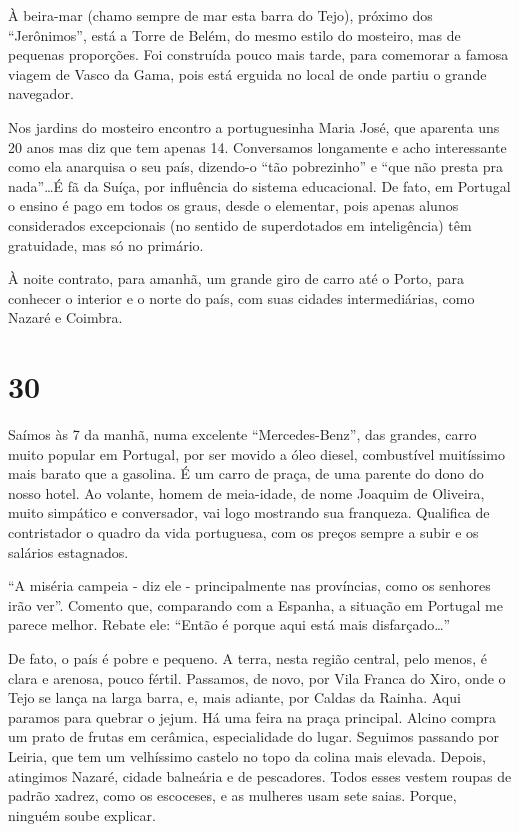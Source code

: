 À beira-mar (chamo sempre de mar esta barra do Tejo), próximo dos ``Jerônimos'', está a Torre de Belém, do mesmo estilo do mosteiro, mas de pequenas proporções. Foi construída pouco mais tarde, para comemorar a famosa viagem de Vasco da Gama, pois está erguida no local de onde partiu o grande navegador.

Nos jardins do mosteiro encontro a portuguesinha Maria José, que aparenta uns 20 anos mas diz que tem apenas 14. Conversamos longamente e acho interessante como ela anarquisa o seu país, dizendo-o ``tão pobrezinho'' e ``que não presta pra nada''\ldots É fã da Suíça, por influência do sistema educacional. De fato, em Portugal o ensino é pago em todos os graus, desde o elementar, pois apenas alunos considerados excepcionais (no sentido de superdotados em inteligência) têm gratuidade, mas só no primário.

À noite contrato, para amanhã, um grande giro de carro até o Porto, para conhecer o interior e o norte do país, com suas cidades intermediárias, como Nazaré e Coimbra.

\section*{30 \adfflatleafright {}}
Saímos às 7 da manhã, numa excelente ``Mercedes-Benz'', das grandes, carro muito popular em Portugal, por ser movido a óleo diesel, combustível muitíssimo mais barato que a gasolina. É um carro de praça, de uma parente do dono do nosso hotel. Ao volante, homem de meia-idade, de nome Joaquim de Oliveira, muito simpático e conversador, vai logo mostrando sua franqueza. Qualifica de contristador o quadro da vida portuguesa, com os preços sempre a subir e os salários estagnados.

``A miséria campeia - diz ele - principalmente nas províncias, como os senhores irão ver''. Comento que, comparando com a Espanha, a situação em Portugal me parece melhor. Rebate ele: ``Então é porque aqui está mais disfarçado\ldots''

De fato, o país é pobre e pequeno. A terra, nesta região central, pelo menos, é clara e arenosa, pouco fértil. Passamos, de novo, por Vila Franca do Xiro, onde o Tejo se lança na larga barra, e, mais adiante, por Caldas da Rainha. Aqui paramos para quebrar o jejum. Há uma feira na praça principal. Alcino compra um prato de frutas em cerâmica, especialidade do lugar. Seguimos passando por Leiria, que tem um velhíssimo castelo no topo da colina mais elevada. Depois, atingimos Nazaré, cidade balneária e de pescadores. Todos esses vestem roupas de padrão xadrez, como os escoceses, e as mulheres usam sete saias. Porque, ninguém soube explicar.

